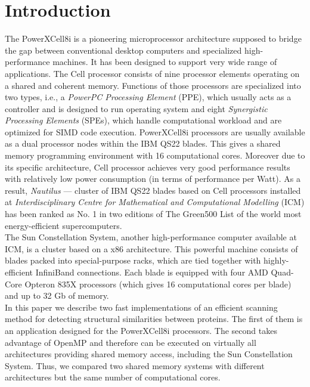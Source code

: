 \section{Introduction}
The PowerXCell8i is a pioneering microprocessor architecture
supposed to bridge the gap between conventional desktop computers and
specialized high-performance machines.
It has been designed to support very wide range of applications.
The Cell processor consists of nine processor elements operating on a
shared and coherent memory.
Functions of those processors are specialized into two types, i.e., a 
\emph{PowerPC Processing Element} (PPE), which usually acts
as a controller and is designed to run operating system and 
eight \emph{Synergistic Processing Elements} (SPEs), which
handle computational workload and are optimized for SIMD code execution.
PowerXCell8i processors are usually available as a dual processor nodes within
the IBM QS22 blades.
This gives a shared memory programming environment with 16
computational cores.
Moreover due to its specific architecture, Cell processor achieves very good
performance results with relatively low power consumption (in terms of
performance per Watt).
As a result, \emph{Nautilus} \cite{nau} --- cluster of IBM QS22 blades based on
Cell processors installed at \emph{Interdisciplinary Centre for Mathematical and
Computational Modelling} (ICM) has been ranked as No. 1 in two editions of
The Green500 List \cite{g500} of the world most energy-efficient supercomputers.\\
The Sun Constellation System, another high-performance computer available at ICM,
is a cluster based on a x86 architecture.
This powerful machine consists of blades packed into special-purpose
racks, which are tied together with highly-efficient InfiniBand connections.
Each blade is equipped with four AMD Quad-Core Opteron 835X processors (which
gives 16 computational cores per blade) and up to 32 Gb of memory.\\
In this paper we describe two fast implementations of an efficient scanning
method for detecting structural similarities between proteins.
The first of them is an application designed for the PowerXCell8i processors.
The second takes advantage of OpenMP and therefore can be executed on
virtually all architectures providing shared memory access, including the Sun
Constellation System.
Thus, we compared two shared memory systems with different
architectures but the same number of computational cores.
